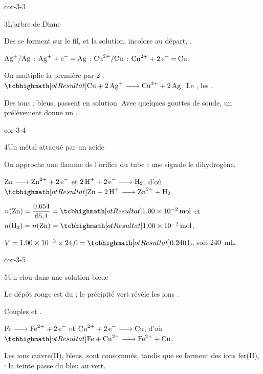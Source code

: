 \begin{blocLivre}{cor-3-3}
\begin{corrige}{3}{L'arbre de Diane}
\begin{questions}
\item Des  se forment sur le fil, et la solution, incolore au départ, .
\item $\ce{Ag+}/\ce{Ag}$ : $\ce{Ag+ + e- = Ag}$ ; $\ce{Cu^{2+}}/\ce{Cu}$ : $\ce{Cu^{2+} + 2e- = Cu}$.
\item On multiplie la première par 2 : $\res{\ce{Cu + 2Ag+ -> Cu^{2+} + 2Ag}}$. Le , les .
\item Des ions , bleus, passent en solution. Avec quelques gouttes de soude, un prélèvement donne un
.
\end{questions}
\end{corrige}
\end{blocLivre}
\begin{blocLivre}{cor-3-4}
\begin{corrige}{4}{Un métal attaqué par un acide}
\begin{questions}
\item On approche une flamme de l'orifice du tube : une  signale le dihydrogène.
\item $\ce{Zn -> Zn^{2+} + 2e-}$ et $\ce{2H+ + 2e- -> H2}$, d'où $\res{\ce{Zn + 2H+ -> Zn^{2+} + H2}}$.
\item $n(\ce{Zn})=\dfrac{0{,}654}{65{,}4}=\res{\qty{1,00e-2}{mol}}$ et $n(\ce{H2})=n(\ce{Zn})=\res{\qty{1,00e-2}{mol}}$.
\item $V=\num{1.00e-2}\times24{,}0=\res{\qty{0,240}{L}}$, soit \qty{240}{mL}.
\end{questions}
\end{corrige}
\end{blocLivre}
\begin{blocLivre}{cor-3-5}
\begin{corrige}{5}{Un clou dans une solution bleue}
\begin{questions}
\item Le dépôt rouge est du  ; le précipité vert révèle les ions .
\item Couples  et .
\item $\ce{Fe -> Fe^{2+} + 2e-}$ et $\ce{Cu^{2+} + 2e- -> Cu}$, d'où $\res{\ce{Fe + Cu^{2+} -> Fe^{2+} + Cu}}$.
\item Les ions cuivre(II), bleus, sont consommés, tandis que se forment des ions fer(II),  : la teinte
passe du bleu au vert.
\end{questions}
\end{corrige}
\end{blocLivre}
